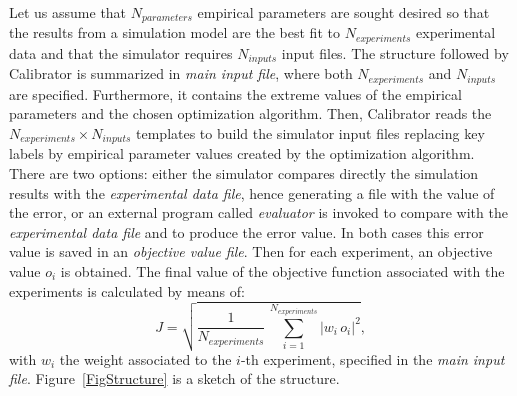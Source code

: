 \documentclass[review,authoryear]{elsarticle}
\newcommand{\EQ}[2]
{\begin{equation}#1\label{#2}\end{equation}}
\newcommand{\PSPICTURE}[7]
{
	\begin{figure}[ht!]
		\centering
		\pspicture(#1,#2)(#3,#4)
			#5
		\endpspicture
		\caption{#6.\label{#7}}
	\end{figure}
}
\newcommand{\ABS}[1]{\left|#1\right|}
\begin{document}
Let us assume that $N_{parameters}$ empirical parameters are sought desired so
that the results from a simulation model are the best fit to $N_{experiments}$
experimental data and that the simulator requires $N_{inputs}$ input files. The
structure followed by Calibrator is summarized in \emph{main input file},
where both $N_{experiments}$ and $N_{inputs}$ are specified. Furthermore, it
contains the extreme values of the empirical parameters and the chosen
optimization algorithm. Then, Calibrator reads the
$N_{experiments}\times N_{inputs}$ templates to build the simulator input files
replacing key labels by empirical parameter values created by the optimization
algorithm. There are two options: either the simulator compares directly the
simulation results with the \emph{experimental data file}, hence generating a
file with the value of the error, or an external program called \emph{evaluator}
is invoked to compare with the \emph{experimental data file} and to produce the
error value. In both cases this error value is saved in an
\emph{objective value file}. Then for each experiment, an objective value $o_i$
is obtained. The final value of the objective function associated with the
experiments is calculated by means of:
\EQ
{
	J=\sqrt{\frac{1}{N_{experiments}}
	\,\sum_{i=1}^{N_{experiments}}\ABS{w_i\,o_i}^2},
}{EqObjectiveFunction}
with $w_i$ the weight associated to the $i$-th experiment, specified in the
\emph{main input file}. Figure~\ref{FigStructure} is a sketch of the
structure.
\end{document}
